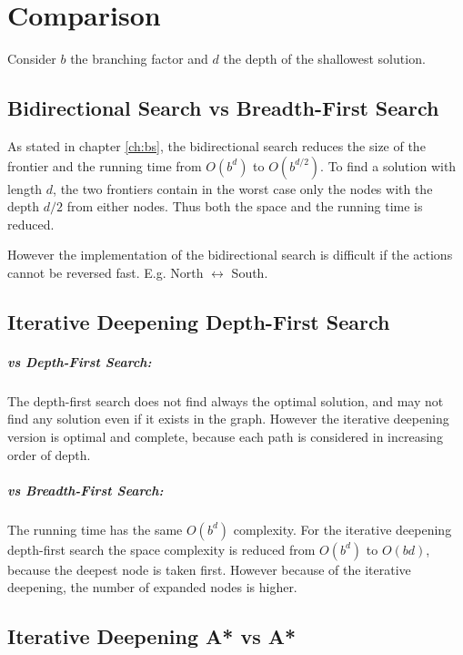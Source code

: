 \chapter{Comparison} 

Consider $b$ the branching factor and $d$ the depth of the shallowest solution.


\section{Bidirectional Search vs Breadth-First Search}

As stated in chapter \ref{ch:bs}, the bidirectional search reduces the size of the frontier and the running time from $O(b^d)$ to $O(b^{d/2})$. To find a solution with length $d$, the two frontiers contain in the worst case only the nodes with the depth $d/2$ from either nodes. Thus both the space and the running time is reduced. 

However the implementation of the bidirectional search is difficult if the actions cannot be reversed fast. E.g. North $\leftrightarrow$ South.


\section{Iterative Deepening Depth-First Search}

\paragraph{vs Depth-First Search:}

The depth-first search does not find always the optimal solution, and may not find any solution even if it exists in the graph. However the iterative deepening version is optimal and complete, because each path is considered in increasing order of depth.

\paragraph{vs Breadth-First Search:}

The running time has the same $O(b^d)$ complexity. For the iterative deepening depth-first search the space complexity is reduced from $O(b^d)$ to $O(bd)$, because the deepest node is taken first. However because of the iterative deepening, the number of expanded nodes is higher.


\section{Iterative Deepening A* vs A*}


